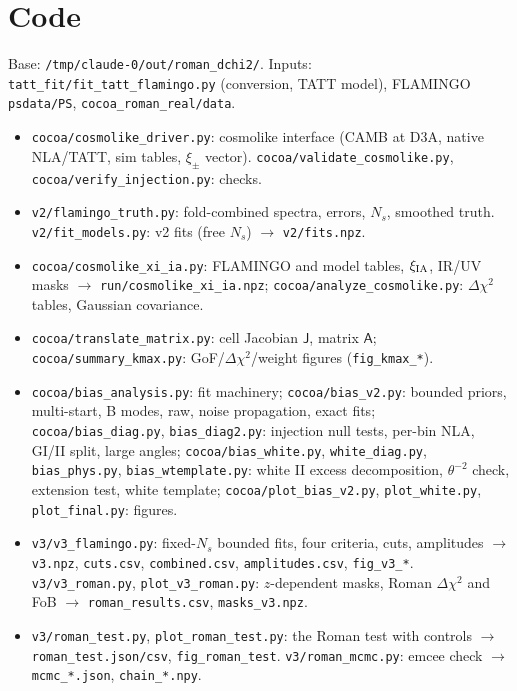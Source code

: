 \documentclass[11pt]{article}
\newcommand{\dchi}{\Delta\chi^2}
\begin{document}
\section{Code}
Base: \texttt{/tmp/claude-0/out/roman\_dchi2/}. Inputs: \texttt{tatt\_fit/fit\_tatt\_flamingo.py} (conversion, TATT model), FLAMINGO \texttt{psdata/PS}, \texttt{cocoa\_roman\_real/data}.
\begin{itemize}\small
\item \texttt{cocoa/cosmolike\_driver.py}: cosmolike interface (CAMB at D3A, native NLA/TATT, sim tables, $\xi_\pm$ vector). \texttt{cocoa/validate\_cosmolike.py}, \texttt{cocoa/verify\_injection.py}: checks.
\item \texttt{v2/flamingo\_truth.py}: fold-combined spectra, errors, $N_s$, smoothed truth. \texttt{v2/fit\_models.py}: v2 fits (free $N_s$) $\rightarrow$ \texttt{v2/fits.npz}.
\item \texttt{cocoa/cosmolike\_xi\_ia.py}: FLAMINGO and model tables, $\xi_{\rm IA}$, IR/UV masks $\rightarrow$ \texttt{run/cosmolike\_xi\_ia.npz}; \texttt{cocoa/analyze\_cosmolike.py}: $\dchi$ tables, Gaussian covariance.
\item \texttt{cocoa/translate\_matrix.py}: cell Jacobian $\mathsf{J}$, matrix $\mathsf{A}$; \texttt{cocoa/summary\_kmax.py}: GoF/$\dchi$/weight figures (\texttt{fig\_kmax\_*}).
\item \texttt{cocoa/bias\_analysis.py}: fit machinery; \texttt{cocoa/bias\_v2.py}: bounded priors, multi-start, B modes, raw, noise propagation, exact fits; \texttt{cocoa/bias\_diag.py}, \texttt{bias\_diag2.py}: injection null tests, per-bin NLA, GI/II split, large angles; \texttt{cocoa/bias\_white.py}, \texttt{white\_diag.py}, \texttt{bias\_phys.py}, \texttt{bias\_wtemplate.py}: white II excess decomposition, $\theta^{-2}$ check, extension test, white template; \texttt{cocoa/plot\_bias\_v2.py}, \texttt{plot\_white.py}, \texttt{plot\_final.py}: figures.
\item \texttt{v3/v3\_flamingo.py}: fixed-$N_s$ bounded fits, four criteria, cuts, amplitudes $\rightarrow$ \texttt{v3.npz}, \texttt{cuts.csv}, \texttt{combined.csv}, \texttt{amplitudes.csv}, \texttt{fig\_v3\_*}. \texttt{v3/v3\_roman.py}, \texttt{plot\_v3\_roman.py}: $z$-dependent masks, Roman $\dchi$ and FoB $\rightarrow$ \texttt{roman\_results.csv}, \texttt{masks\_v3.npz}.
\item \texttt{v3/roman\_test.py}, \texttt{plot\_roman\_test.py}: the Roman test with controls $\rightarrow$ \texttt{roman\_test.json/csv}, \texttt{fig\_roman\_test}. \texttt{v3/roman\_mcmc.py}: emcee check $\rightarrow$ \texttt{mcmc\_*.json}, \texttt{chain\_*.npy}.

\end{itemize}
\end{document}
